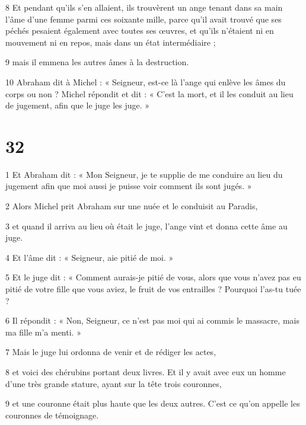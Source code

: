\par 8 Et pendant qu'ils s'en allaient, ils trouvèrent un ange tenant dans sa main l'âme d'une femme parmi ces soixante mille, parce qu'il avait trouvé que ses péchés pesaient également avec toutes ses œuvres, et qu'ils n'étaient ni en mouvement ni en repos, mais dans un état intermédiaire ;

\par 9 mais il emmena les autres âmes à la destruction.

\par 10 Abraham dit à Michel : « Seigneur, est-ce là l'ange qui enlève les âmes du corps ou non ? Michel répondit et dit : « C'est la mort, et il les conduit au lieu de jugement, afin que le juge les juge. »

\chapter{32}

\par 1 Et Abraham dit : « Mon Seigneur, je te supplie de me conduire au lieu du jugement afin que moi aussi je puisse voir comment ils sont jugés. »

\par 2 Alors Michel prit Abraham sur une nuée et le conduisit au Paradis,

\par 3 et quand il arriva au lieu où était le juge, l'ange vint et donna cette âme au juge.

\par 4 Et l'âme dit : « Seigneur, aie pitié de moi. »

\par 5 Et le juge dit : « Comment aurais-je pitié de vous, alors que vous n'avez pas eu pitié de votre fille que vous aviez, le fruit de vos entrailles ? Pourquoi l’as-tu tuée ?

\par 6 Il répondit : « Non, Seigneur, ce n'est pas moi qui ai commis le massacre, mais ma fille m'a menti. »

\par 7 Mais le juge lui ordonna de venir et de rédiger les actes,

\par 8 et voici des chérubins portant deux livres. Et il y avait avec eux un homme d'une très grande stature, ayant sur la tête trois couronnes,

\par 9 et une couronne était plus haute que les deux autres. C'est ce qu'on appelle les couronnes de témoignage.


